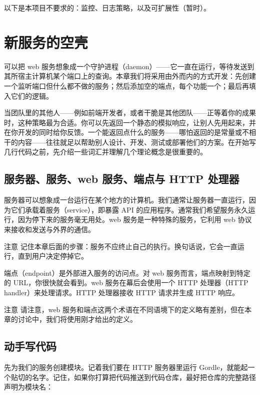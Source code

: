 以下是本项目不要求的：监控、日志策略，以及可扩展性（暂时）。

\section{新服务的空壳}

可以把 web 服务想象成一个守护进程（daemon）——它一直在运行，等待发送到其所宿主计算机某个端口上的查询。本章我们将采用由外而内的方式开发：先创建一个监听端口但什么都不做的服务；然后添加空的端点，每个功能一个；最后再填入它们的逻辑。

当团队里的其他人——例如前端开发者，或者干脆是其他团队——正等着你的成果时，这种策略最为合适。你可以先返回一个静态的模拟响应，让别人先用起来，并在你开发的同时给你反馈。一个能返回点什么的服务——哪怕返回的是常量或不相干的内容——往往就足以帮助别人设计、开发、测试或部署他们的方案。在开始写几行代码之前，先介绍一些词汇并理解几个理论概念是很重要的。

\subsection{服务器、服务、web 服务、端点与 HTTP 处理器}

服务器可以想象成一台运行在某个地方的计算机。我们通常让服务器一直运行，因为它们承载着服务（service），即暴露 API 的应用程序。通常我们希望服务永久运行，因为停下来的服务毫无用处。web 服务是一种特殊的服务，它利用 web 协议来接收和发送与外界的通信。

\begin{infobox}{注意}
记住本章后面的步骤：服务不应终止自己的执行。换句话说，它会一直运行，直到用户决定停掉它。
\end{infobox}

端点（endpoint）是外部进入服务的访问点。对 web 服务而言，端点映射到特定的 URL，你很快就会看到。web 服务在幕后会使用一个 HTTP 处理器（HTTP handler）来处理请求。HTTP 处理器接收 HTTP 请求并生成 HTTP 响应。

\begin{infobox}{注意}
请注意，web 服务和端点这两个术语在不同语境下的定义略有差别，但在本章的讨论中，我们将使用刚才给出的定义。
\end{infobox}

\subsection{动手写代码}

先为我们的服务创建模块。记着我们要在 HTTP 服务器里运行 Gordle，就能起一个贴切的名字。记住，如果你打算把代码推送到代码仓库，最好把仓库的完整路径声明为模块名：

